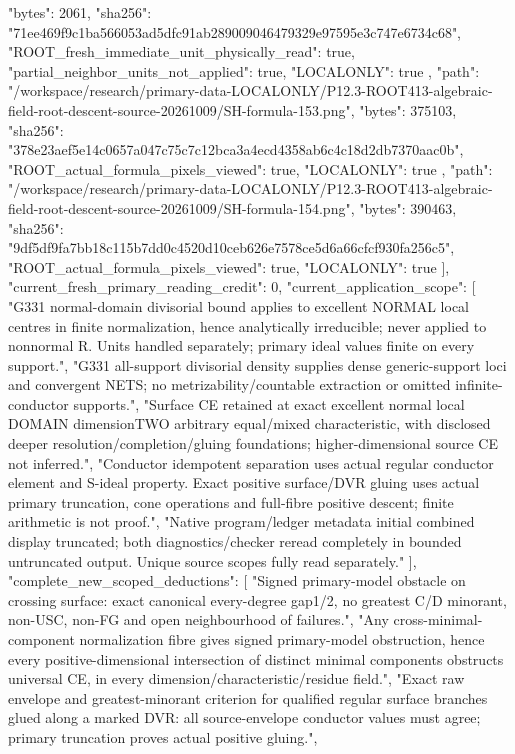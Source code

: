 \documentclass[11pt]{article}
\begin{document}
\begin{Full422Data}
{{      "bytes": 2061,
      "sha256": "71ee469f9c1ba566053ad5dfc91ab289009046479329e97595e3c747e6734c68",
      "ROOT_fresh_immediate_unit_physically_read": true,
      "partial_neighbor_units_not_applied": true,
      "LOCALONLY": true
    },
    {
      "path": "/workspace/research/primary-data-LOCALONLY/P12.3-ROOT413-algebraic-field-root-descent-source-20261009/SH-formula-153.png",
      "bytes": 375103,
      "sha256": "378e23aef5e14c0657a047c75c7c12bca3a4ecd4358ab6c4c18d2db7370aac0b",
      "ROOT_actual_formula_pixels_viewed": true,
      "LOCALONLY": true
    },
    {
      "path": "/workspace/research/primary-data-LOCALONLY/P12.3-ROOT413-algebraic-field-root-descent-source-20261009/SH-formula-154.png",
      "bytes": 390463,
      "sha256": "9df5df9fa7bb18c115b7dd0c4520d10ceb626e7578ce5d6a66cfcf930fa256c5",
      "ROOT_actual_formula_pixels_viewed": true,
      "LOCALONLY": true
    }
  ],
  "current_fresh_primary_reading_credit": 0,
  "current_application_scope": [
    "G331 normal-domain divisorial bound applies to excellent NORMAL local centres in finite normalization, hence analytically irreducible; never applied to nonnormal R. Units handled separately; primary ideal values finite on every support.",
    "G331 all-support divisorial density supplies dense generic-support loci and convergent NETS; no metrizability/countable extraction or omitted infinite-conductor supports.",
    "Surface CE retained at exact excellent normal local DOMAIN dimensionTWO arbitrary equal/mixed characteristic, with disclosed deeper resolution/completion/gluing foundations; higher-dimensional source CE not inferred.",
    "Conductor idempotent separation uses actual regular conductor element and S-ideal property. Exact positive surface/DVR gluing uses actual primary truncation, cone operations and full-fibre positive descent; finite arithmetic is not proof.",
    "Native program/ledger metadata initial combined display truncated; both diagnostics/checker reread completely in bounded untruncated output. Unique source scopes fully read separately."
  ],
  "complete_new_scoped_deductions": [
    "Signed primary-model obstacle on crossing surface: exact canonical every-degree gap1/2, no greatest C/D minorant, non-USC, non-FG and open neighbourhood of failures.",
    "Any cross-minimal-component normalization fibre gives signed primary-model obstruction, hence every positive-dimensional intersection of distinct minimal components obstructs universal CE, in every dimension/characteristic/residue field.",
    "Exact raw envelope and greatest-minorant criterion for qualified regular surface branches glued along a marked DVR: all source-envelope conductor values must agree; primary truncation proves actual positive gluing.",
}
\end{Full422Data}
\end{document}
